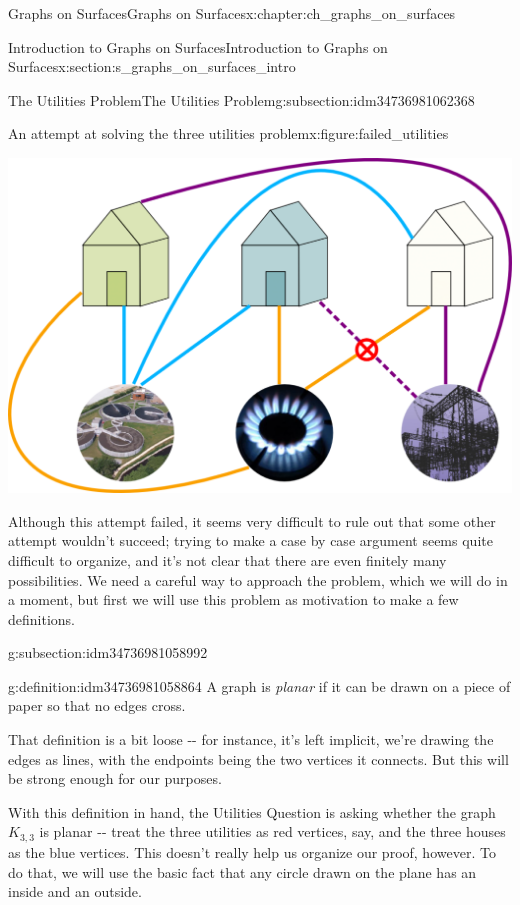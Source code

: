 \documentclass[oneside,10pt,]{book}
\numberwithin{equation}{section}
\begin{document}
\begin{chapterptx}{Graphs on Surfaces}{}{Graphs on Surfaces}{}{}{x:chapter:ch_graphs_on_surfaces}
\begin{sectionptx}{Introduction to Graphs on Surfaces}{}{Introduction to Graphs on Surfaces}{}{}{x:section:s_graphs_on_surfaces_intro}
\begin{subsectionptx}{The Utilities Problem}{}{The Utilities Problem}{}{}{g:subsection:idm34736981062368}
\begin{figureptx}{An attempt at solving the three utilities problem}{x:figure:failed_utilities}{}
\begin{image}{0.15}{0.7}{0.15}
\includegraphics[width=\linewidth]{images/The-Utilities-Problem-Bad-Solution.png}
\end{image}%
\tcblower
\end{figureptx}%
Although this attempt failed, it seems very difficult to rule out that some other attempt wouldn't succeed; trying to make a case by case argument seems quite difficult to organize, and it's not clear that there are even finitely many possibilities.  We need a careful way to approach the problem, which we will do in a moment, but first we will use this problem as motivation to make a few definitions.%
\end{subsectionptx}
%
%
\typeout{************************************************}
\typeout{************************************************}
%
\begin{subsectionptx}{}{}{}{}{}{g:subsection:idm34736981058992}
\begin{definition}{}{g:definition:idm34736981058864}%
A graph is \emph{planar} if it can be drawn on a piece of paper so that no edges cross.%
\end{definition}
That definition is a bit loose -{}-{} for instance, it's left implicit, we're drawing the edges as lines, with the endpoints being the two vertices it connects.  But this will be strong enough for our purposes.%
\par
With this definition in hand, the Utilities Question is asking whether the graph \(K_{3,3}\) is planar -{}-{} treat the three utilities as red vertices, say, and the three houses as the blue vertices.  This doesn't really help us organize our proof, however. To do that, we will use the basic fact that any circle drawn on the plane has an inside and an outside.%

\end{subsectionptx}
\end{sectionptx}
\end{chapterptx}
\end{document}
